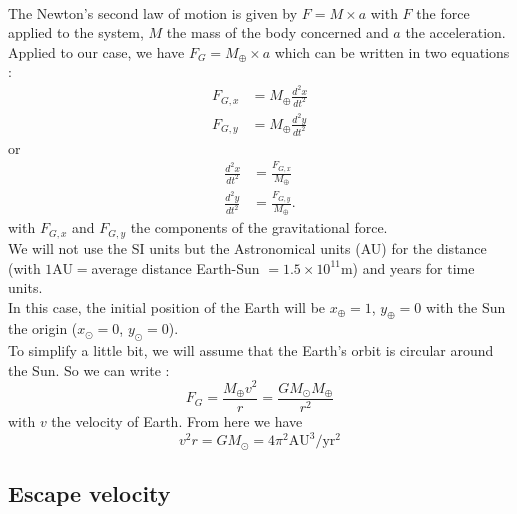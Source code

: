 \documentclass[a4paper, twoside, 11pt]{report}
\theoremstyle{theorem}
\theoremstyle{remark}
\theoremstyle{exemple}
\begin{document}
            \paragraph{}The Newton's second law of motion is given by $F=M \times a$ with $F$ the force applied to the system, $M$ the mass of the body concerned and $a$ the acceleration. Applied to our case, we have $F_G = M_{\oplus} \times a$ which can be written in two equations : 
                \begin{align*}
                    F_{G,x} &= M_{\oplus} \frac{d^2 x}{dt^2} \\
                    F_{G,y} &= M_{\oplus} \frac{d^2 y}{dt^2}
                \end{align*}
            or
                \begin{align}
                    \frac{d^2 x}{dt^2} &= \frac{F_{G,x}}{M_{\oplus}} \tag{1}\\
                    \frac{d^2 y}{dt^2} &= \frac{F_{G,y}}{M_{\oplus}} \tag{2}.
                \end{align}
            with $F_{G,x}$ and $F_{G,y}$ the components of the gravitational force.\\
            We will not use the SI units but the Astronomical units (AU) for the distance (with $1$AU$=$average distance Earth-Sun $=1.5 \times 10^{11}$m) and years for time units. \\
            In this case, the initial position of the Earth will be $x_{\oplus} = 1$, \hspace{0,1cm}$y_{\oplus} = 0$ with the Sun the origin ($x_{\odot} = 0$, $y_{\odot} = 0$). \\
            To simplify a little bit, we will assume that the Earth's orbit is circular around the Sun. So we can write :
                \begin{equation}
                    F_G = \frac{M_{\oplus} v^2}{r} = \frac{GM_{\odot}M_{\oplus}}{r^2}
                    \tag{3}
                \end{equation}
            with $v$ the velocity of Earth. From here we have
                \begin{equation*}
                    v^2 r = GM_{\odot} = 4 \pi^2 \mathrm{AU}^3 / \mathrm{yr}^2
                    \tag{4}
                \end{equation*}
            
        \subsection{Escape velocity}
\end{document}
